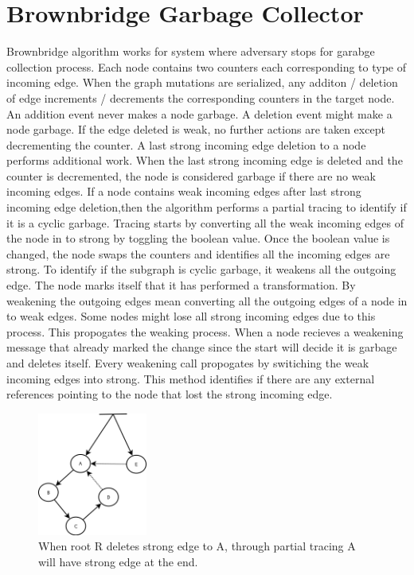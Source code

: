 \section{Brownbridge Garbage Collector}
Brownbridge algorithm works for system where adversary stops for garabge collection process. Each node contains two counters each corresponding to type of incoming edge. When the graph mutations are serialized, any additon / deletion of edge increments / decrements the corresponding counters in the target node. An addition event never makes a node garbage. A deletion event might make a node garbage. If the edge deleted is weak, no further actions are taken except decrementing the counter. A last strong incoming edge deletion to a node performs additional work. When the last strong incoming edge is deleted and the counter is decremented, the node is considered garbage if there are no weak incoming edges. If a node contains weak incoming edges after last strong incoming edge deletion,then the algorithm performs a partial tracing to identify if it is a cyclic garbage. Tracing starts by converting all the weak incoming edges of the node in to strong by toggling the boolean value. Once the boolean value is changed, the node swaps the counters and identifies all the incoming edges are strong. To identify if the subgraph is cyclic garbage, it weakens all the outgoing edge. The node marks itself that it has performed a transformation. By weakening the outgoing edges mean converting all the outgoing edges of a node in to weak edges. Some nodes might lose all strong incoming edges due to this process. This propogates the weaking process. When a node recieves a weakening message that already marked the change since the start will decide it is garbage and deletes itself. Every weakening call propogates by switiching the weak incoming edges into strong. This method identifies if there are any external references pointing to the node that lost the strong incoming edge. 

\begin{figure}[!t]
	\centering
	\includegraphics[width=0.32\textwidth]{figs/brownbridge}
	\caption{When root R deletes strong edge to A, through partial tracing A will have strong edge at the end.}
	\label{brownbridge}
\end{figure}

